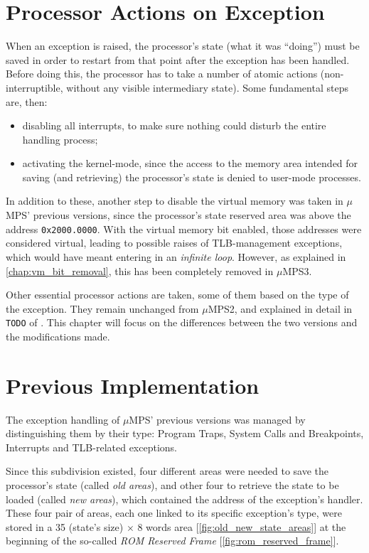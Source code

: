 \documentclass[12pt,a4paper,openright,twoside]{report}
\begin{document}
\section{Processor Actions on Exception}
When an exception is raised, the processor's state (what it was ``doing'') must be saved in order to restart from that point after the exception has been handled.
Before doing this, the processor has to take a number of atomic actions (non-interruptible, without any visible intermediary state).
Some fundamental steps are, then:
\begin{itemize}
	\item disabling all interrupts, to make sure nothing could disturb the entire handling process;
	\item activating the kernel-mode, since the access to the memory area intended for saving (and retrieving) the processor's state is denied to user-mode processes.
\end{itemize}
In addition to these, another step to disable the virtual memory was taken in $\mu$MPS' previous versions, since the processor's state reserved area was above the address \texttt{0x2000.0000}.
With the virtual memory bit enabled, those addresses were considered virtual, leading to possible raises of TLB-management exceptions, which would have meant entering in an \textit{infinite loop}.
However, as explained in \autoref{chap:vm_bit_removal}, this has been completely removed in $\mu$MPS3.

Other essential processor actions are taken, some of them based on the type of the exception.
They remain unchanged from $\mu$MPS2, and explained in detail in \texttt{TODO} of \cite{pops}.
This chapter will focus on the differences between the two versions and the modifications made.

\section{Previous Implementation}
The exception handling of $\mu$MPS' previous versions was managed by distinguishing them by their type: Program Traps, System Calls and Breakpoints, Interrupts and TLB-related exceptions.

Since this subdivision existed, four different areas were needed to save the processor's state (called \textit{old areas}), and other four to retrieve the state to be loaded (called \textit{new areas}), which contained the address of the exception's handler.
These four pair of areas, each one linked to its specific exception's type, were stored in a 35 (state's size) $\times$ 8 words area [\autoref{fig:old_new_state_areas}] at the beginning of the so-called \textit{ROM Reserved Frame} [\autoref{fig:rom_reserved_frame}].
\end{document}
